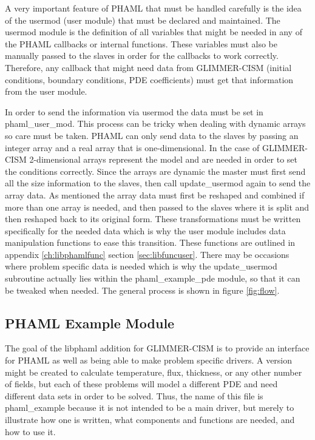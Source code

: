 A very important feature of PHAML that must be handled carefully is the idea of the usermod (user module) that must be declared and maintained.  The usermod module is the definition of all variables that might be needed in any of the PHAML callbacks or internal functions.  These variables must also be manually passed to the slaves in order for the callbacks to work correctly.  Therefore, any callback that might need data from GLIMMER-CISM (initial conditions, boundary conditions, PDE coefficients) must get that information from the user module.  

In order to send the information via usermod the data must be set in phaml\_user\_mod.  This process can be tricky when dealing with dynamic arrays so care must be taken.  PHAML can only send data to the slaves by passing an integer array and a real array that is one-dimensional.  In the case of GLIMMER-CISM 2-dimensional arrays represent the model and are needed in order to set the conditions correctly.  Since the arrays are dynamic the master must first send all the size information to the slaves, then call update\_usermod again to send the array data.  As mentioned the array data must first be reshaped and combined if more than one array is needed, and then passed to the slaves where it is split and then reshaped back to its original form.  These transformations must be written specifically for the needed data which is why the user module includes data manipulation functions to ease this transition.  These functions are outlined in appendix \ref{ch:libphamlfunc} section \ref{sec:libfuncuser}.  There may be occasions where problem specific data is needed which is why the update\_usermod subroutine actually lies within the phaml\_example\_pde module, so that it can be tweaked when needed.  The general process is shown in figure \ref{fig:flow}.


  

\subsection{PHAML Example Module}\label{sec:ch4example}

The goal of the libphaml addition for GLIMMER-CISM is to provide an interface for PHAML as well as being able to make problem specific drivers.  A version might be created to calculate temperature, flux, thickness, or any other number of fields, but each of these problems will model a different PDE and need different data sets in order to be solved.  Thus, the name of this file is phaml\_example because it is not intended to be a main driver, but merely to illustrate how one is written, what components and functions are needed, and how to use it.


